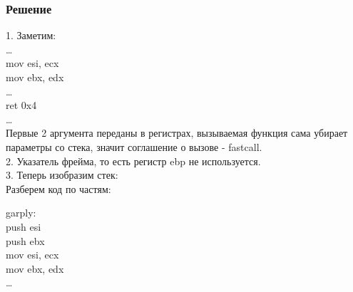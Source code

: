 \documentclass[12pt, letterpaper]{article}
\begin{document}
\subsubsection{Решение}
1. Заметим:\\
\dots\\
mov esi, ecx\\
mov ebx, edx\\
\dots\\
ret 0x4\\
\dots\\
Первые 2 аргумента переданы в регистрах, вызываемая функция сама убирает параметры со стека, значит соглашение о вызове - fastcall.\\

2. Указатель фрейма, то есть регистр ebp не используется.\\

3. Теперь изобразим стек:\\

Разберем код по частям:\\
\begin{minipage}{.4\textwidth}
    \noindent garply:\\
        push   esi\\
        push   ebx\\
        mov    esi, ecx\\
        mov    ebx, edx\\
    \dots\\
\end{minipage}%
\begin{minipage}{.4\textwidth}
\end{minipage}%
\end{document}
